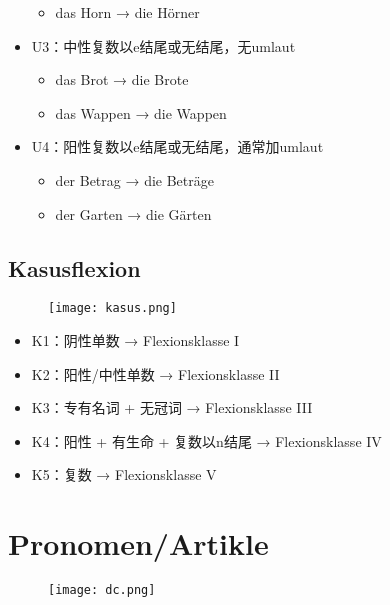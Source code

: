 \documentclass[UTF8]{report}
\begin{document}
\begin{itemize}
\begin{itemize}
        \item das Horn → die Hörner
    \end{itemize}
    \item U3：中性复数以e结尾或无结尾，无umlaut
    \begin{itemize}
        \item das Brot → die Brote
        \item das Wappen → die Wappen
    \end{itemize}
    \item U4：阳性复数以e结尾或无结尾，通常加umlaut
    \begin{itemize}
        \item der Betrag → die Beträge
        \item der Garten → die Gärten
    \end{itemize}
\end{itemize}

\section{Kasusflexion}
\begin{figure}[H]
    \centering
    \texttt{[image: kasus.png]}
\end{figure}

\begin{itemize}
    \item K1：阴性单数 → Flexionsklasse I 
    \item K2：阳性/中性单数 → Flexionsklasse II
    \item K3：专有名词 + 无冠词 → Flexionsklasse III
    \item K4：阳性 + 有生命 + 复数以n结尾 → Flexionsklasse IV
    \item K5：复数 → Flexionsklasse V
\end{itemize}


\chapter{Pronomen/Artikle}
\begin{figure}[H]
    \centering
    \texttt{[image: dc.png]}
\end{figure}
\end{document}
